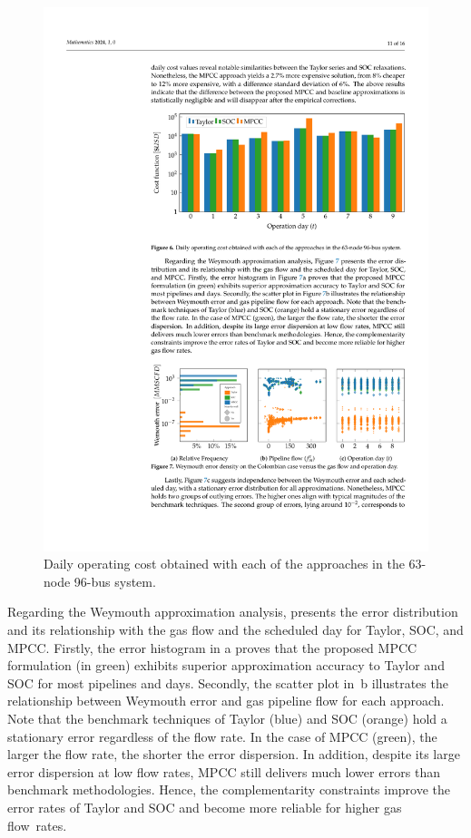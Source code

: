 \begin{figure}[H]
   \hspace{-6pt}  \includegraphics[scale=0.98]{figures/Chapter_MPCC/g005.pdf}
    \caption{Daily operating cost obtained with each of the approaches in the 63-node 96-bus system.}
    \label{fig:red_test_cost}
\end{figure}


Regarding the Weymouth approximation analysis,  presents the error distribution and its relationship with the gas flow and the scheduled day for Taylor, SOC, and MPCC. Firstly, the error histogram in a proves that the proposed MPCC formulation (in green) exhibits superior approximation accuracy to Taylor and SOC for most pipelines and days. Secondly, the scatter plot in~b  illustrates the relationship between Weymouth error and gas pipeline flow for each approach. Note that the benchmark techniques of Taylor (blue) and SOC (orange) hold a stationary error regardless of the flow rate. In the case of MPCC (green), the larger the flow rate, the shorter the error dispersion. In addition, despite its large error dispersion at low flow rates, MPCC still delivers much lower errors than benchmark methodologies. Hence, the complementarity constraints improve the error rates of Taylor and SOC and become more reliable for higher gas \mbox{flow rates}.


